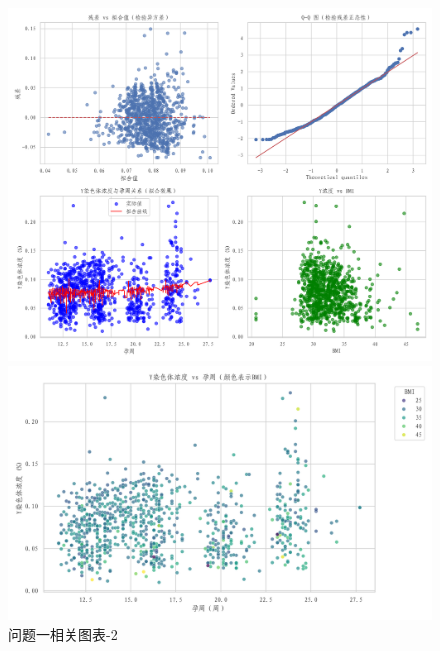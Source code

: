 \documentclass[withoutpreface,bwprint]{cumcmthesis} %
\begin{document}
\begin{appendices}
    \begin{figure}[H]
        \centering
        \begin{minipage}{0.49\textwidth}
            \centering
            \includegraphics[width=\textwidth]{../figure/C1_Output/residual_diagnostics.png}
        \end{minipage}
        \begin{minipage}{0.49\textwidth}
            \centering
            \includegraphics[width=\textwidth]{../figure/C1_Output/scatter_y_vs_gw_by_bmi.png}
        \end{minipage}
        \caption{问题一相关图表-2}
        \label{fig:q1-2}
    \end{figure}


\end{appendices}
\end{document}
